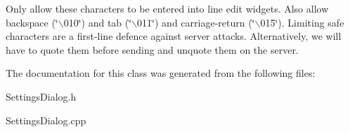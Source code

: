 Only allow these characters to be entered into line edit widgets. Also allow backspace (\char`\"{}$\backslash$010\char`\"{}) and tab (\char`\"{}$\backslash$011\char`\"{}) and carriage-return (\char`\"{}$\backslash$015\char`\"{}). Limiting safe characters are a first-line defence against server attacks. Alternatively, we will have to quote them before sending and unquote them on the server. 

The documentation for this class was generated from the following files:\begin{CompactItemize}
\item 
SettingsDialog.h\item 
SettingsDialog.cpp\end{CompactItemize}

